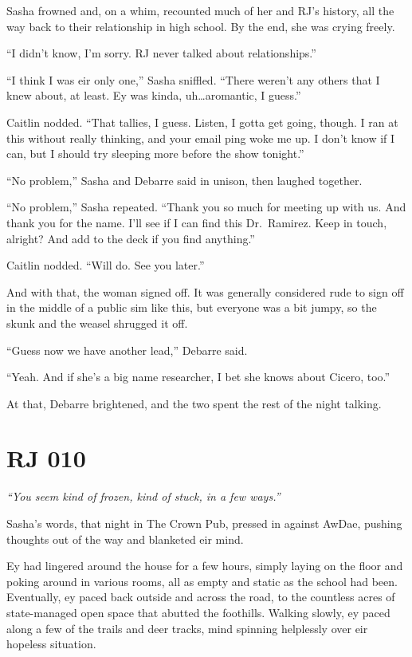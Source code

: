 Sasha frowned and, on a whim, recounted much of her and RJ's history, all the way back to their relationship in high school. By the end, she was crying freely.

``I didn't know, I'm sorry. RJ never talked about relationships.''

``I think I was eir only one,'' Sasha sniffled. ``There weren't any others that I knew about, at least. Ey was kinda, uh\ldots{}aromantic, I guess.''

Caitlin nodded. ``That tallies, I guess. Listen, I gotta get going, though. I ran at this without really thinking, and your email ping woke me up. I don't know if I can, but I should try sleeping more before the show tonight.''

``No problem,'' Sasha and Debarre said in unison, then laughed together.

``No problem,'' Sasha repeated. ``Thank you so much for meeting up with us. And thank you for the name. I'll see if I can find this Dr.~Ramirez. Keep in touch, alright? And add to the deck if you find anything.''

Caitlin nodded. ``Will do. See you later.''

And with that, the woman signed off. It was generally considered rude to sign off in the middle of a public sim like this, but everyone was a bit jumpy, so the skunk and the weasel shrugged it off.

``Guess now we have another lead,'' Debarre said.

``Yeah. And if she's a big name researcher, I bet she knows about Cicero, too.''

At that, Debarre brightened, and the two spent the rest of the night talking.

\chapter*{RJ 010}

\emph{``You seem kind of frozen, kind of stuck, in a few ways.''}

Sasha's words, that night in The Crown Pub, pressed in against AwDae, pushing thoughts out of the way and blanketed eir mind.

Ey had lingered around the house for a few hours, simply laying on the floor and poking around in various rooms, all as empty and static as the school had been. Eventually, ey paced back outside and across the road, to the countless acres of state-managed open space that abutted the foothills. Walking slowly, ey paced along a few of the trails and deer tracks, mind spinning helplessly over eir hopeless situation.

